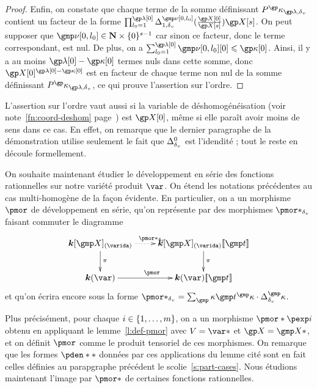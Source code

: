 \begin{proof}
  Enfin, on constate que chaque terme de la somme définissant
  \( P^\derp_{\ip, \dv} \) contient un facteur de la forme
  \(
    \prod_{\indi_0 = 1}^{\ip[0]}
    \pmnum_{1, \dv}^{\gmp\nu[0, \indi_0]}( \frac{ \vp[0] }{ \vp[\anydim] } )
    \vp[\anydim]
  \). On peut supposer que \( \gmp\nu[0, \indi_0] \in \N \times
    \set{0}^{\anydim-1} \) car sinon ce facteur, donc le terme correspondant,
  est nul. De plus, on a \( \sum_{\indi_0 = 1}^{\ip[0]} \gmp\nu[0, \indi_0][0]
    \le \derp[0] \). Ainsi, il y a au moins \( \ip[0] - \derp[0] \) termes
  nuls dans cette somme, donc \( \vp[0]^{\ip[0] - \derp[0]} \) est en
  facteur de chaque terme non nul de la somme définissant \( P^\derp_{\ip,
      \dv} \), ce qui prouve l'assertion sur l'ordre.
\end{proof}

\begin{rem}
  L'assertion sur l'ordre vaut aussi si la variable de déshomogénéisation
  (voir note~\ref{fn:coord-deshom} page~\pageref{fn:coord-deshom}) est
  \( \vp[0] \), même si elle paraît  avoir moins de sens dans ce
  cas. En effet, on remarque que le dernier paragraphe de la démonstration
  utilise seulement le fait que \( \pdiff^0 \) est l'idendité ; tout le reste
  en découle formellement.
\end{rem}

On souhaite maintenant étudier le développement en série des fonctions
rationnelles sur notre variété produit \( \var \).  On étend les notations
précédentes au cas multi-homogène de la façon évidente. En particulier, on a
un morphisme \( \pmor \) de développement en série, qu'on représente par des
morphismes \( \pmor*_\dv \) faisant commuter le diagramme
\begin{equation}
  \xymatrix{
    \cdn[\vmp]_{(\varida)}                 \ar[d]^\pi  \ar@{.>}[r]^{\pmor*_\dv}
    & \cdn[\vmp]_{(\varida)} \series\psmp  \ar[d]^\pi
    \\ \cdn(\var)                                     \ar[r]^{\pmor}
    & \cdn(\var)\series\psmp
  }
\end{equation}
et qu'on écrira encore sous la forme \( \pmor*_\dv = \sum_\dermp \psmp^\dermp
  \cdot \pdiff^\dermp \).

Plus précisément, pour chaque \( i \in \lbrace1, \dots, m\rbrace \), on a un
morphisme \( \pmor*\pexp\fct \) obtenu en appliquant le lemme~\ref{l:def-pmor}
avec \( V = \var* \) et \( \vp = \vmp* \), et on définit \( \pmor \) comme le
produit tensoriel de ces morphismes. On remarque que les formes \( \pden** \)
données par ces applications du lemme cité sont en fait celles définies au
parapgraphe précédent le scolie~\ref{s:part-cases}.  Nous étudions maintenant
l'image par \( \pmor* \) de certaines fonctions rationnelles.

